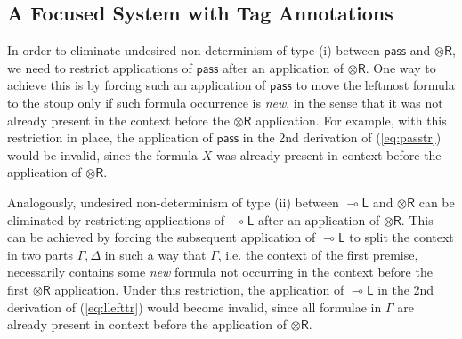 \documentclass[copyright,creativecommons]{eptcs}
\theoremstyle{definition}
\newcommand{\tr}{\otimes \mathsf{R}}
\newcommand{\lright}{{\multimap}\mathsf{R}}
\newcommand{\lleft}{{\multimap}\mathsf{L}}
\newcommand{\pass}{\mathsf{pass}}
\newcommand{\ax}{\mathsf{ax}}
\newcommand{\ot}{\otimes}
\newcommand{\lolli}{\multimap}
\newcommand{\RI}{\mathsf{RI}}
\newcommand{\LI}{\mathsf{LI}}
\newcommand{\Pass}{\mathsf{P}}
\newcommand{\F}{\mathsf{F}}
\begin{document}

\subsection{A Focused System with Tag Annotations}\label{sec:tag}

In order to eliminate undesired non-determinism of type (i) between $\pass$ and $\tr$, we need to restrict applications of $\pass$ after an application of $\tr$.
One way to achieve this is by forcing such an application of $\pass$ to move the leftmost formula to the stoup only if such formula occurrence is \emph{new}, in the sense that it was not already present in the context before the $\tr$ application. For example, with this restriction in place, the application of $\pass$ in the 2nd derivation of (\ref{eq:passtr}) would be invalid, since the formula $X$ was already present in context before the application of $\tr$.

Analogously, undesired non-determinism of type (ii) between $\lleft$ and $\tr$ can be eliminated by restricting applications of $\lleft$ after an application of $\tr$. This can be achieved by forcing the subsequent application of $\lleft$ to split the context in two parts $\Gamma,\Delta$ in such a way that $\Gamma$, i.e. the context of the first premise, necessarily contains some \emph{new} formula not occurring in the context before the first $\tr$ application. Under this restriction, the application of $\lleft$ in the 2nd derivation of (\ref{eq:llefttr}) would become invalid, since all formulae in $\Gamma$ are already present in context before the application of $\tr$.
\end{document}
